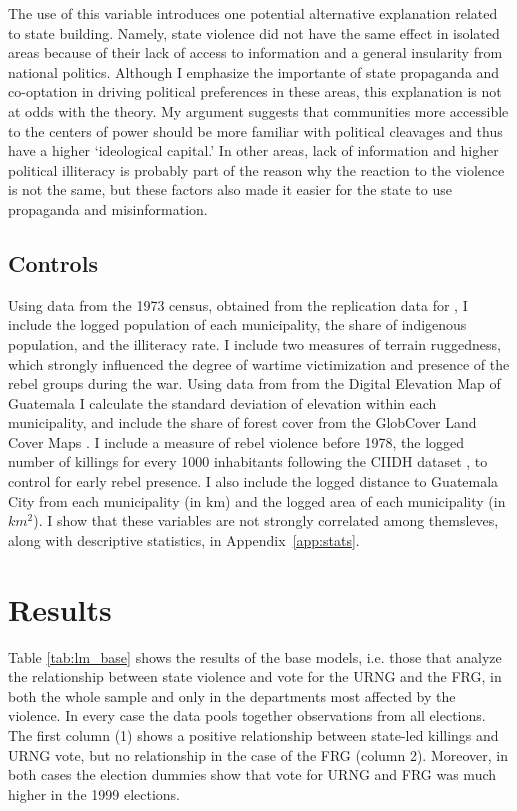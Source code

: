\documentclass[12pt, notitlepage]{article}
\begin{document}
The use of this variable introduces one potential alternative explanation related to state building.
Namely, state violence did not have the same effect in isolated areas because of their lack of access to information and a general insularity from national politics.
Although I emphasize the importante of state propaganda and co-optation in driving political preferences in these areas, this explanation is not at odds with the theory.
My argument suggests that communities more accessible to the centers of power should be more familiar with political cleavages and thus have a higher `ideological capital.'
In other areas, lack of information and higher political illiteracy is probably part of the reason why the reaction to the violence is not the same, but these factors also made it easier for the state to use propaganda and misinformation.

\subsection*{Controls}

Using data from the 1973 census, obtained from the replication data for \citet{Sullivan:2012aa}, I include the logged population of each municipality, the share of indigenous population, and the illiteracy rate.
I include two measures of terrain ruggedness, which strongly influenced the degree of wartime victimization and presence of the rebel groups during the war.
Using data from from the Digital Elevation Map of Guatemala \citep{Mapzen:2018aa} I calculate the standard deviation of elevation within each municipality, and include the share of forest cover from the GlobCover Land Cover Maps \citep{Arino:2012aa}.
I include a measure of rebel violence before 1978, the logged number of killings for every 1000 inhabitants following the CIIDH dataset \citep{Ball:1999aa}, to control for early rebel presence.
I also include the logged distance to Guatemala City from each municipality (in km) and the logged area of each municipality (in $km^2$).
I show that these variables are not strongly correlated among themsleves, along with descriptive statistics, in Appendix~\ref{app:stats}.

\section*{Results}

Table \ref{tab:lm_base} shows the results of the base models, i.e. those that analyze the relationship between state violence and vote for the URNG and the FRG, in both the whole sample and only in the departments most affected by the violence.
In every case the data pools together observations from all elections.
The first column (1) shows a positive relationship between state-led killings and URNG vote, but no relationship in the case of the FRG (column 2).
Moreover, in both cases the election dummies show that vote for URNG and FRG was much higher in the 1999 elections.
\end{document}
